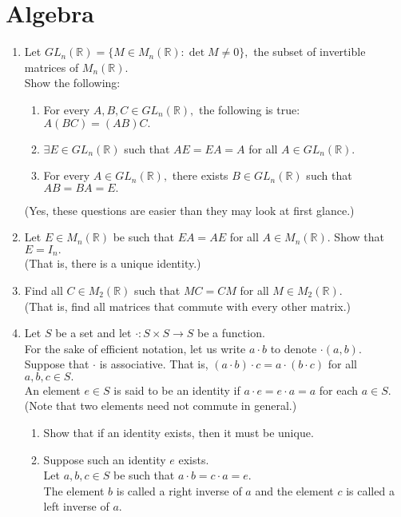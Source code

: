 \documentclass[12pt]{article}
\begin{document}
\section{Algebra}
\begin{enumerate} 
	\item Let $GL_n(\mathbb{R}) = \{M \in M_n(\mathbb{R}) : \det M \neq 0\},$ the subset of invertible matrices of $M_n(\mathbb{R}).$\\
	Show the following:
	\begin{enumerate}[nosep] 
		\item For every $A, B, C \in GL_n(\mathbb{R}),$ the following is true: $A(BC) = (AB)C.$ 
		\item $\exists E \in GL_n(\mathbb{R})$ such that $AE = EA = A$ for all $A \in GL_n(\mathbb{R}).$
		\item For every $A \in GL_n(\mathbb{R}),$ there exists $B \in GL_n(\mathbb{R})$ such that $AB = BA = E.$
	\end{enumerate}
	(Yes, these questions are easier than they may look at first glance.)
	\item Let $E \in M_n(\mathbb{R})$ be such that $EA = AE$ for all $A \in M_n(\mathbb{R}).$ Show that $E = I_n.$\\
	(That is, there is a unique identity.)
	\item Find all $C \in M_2(\mathbb{R})$ such that $MC = CM$ for all $M \in M_2(\mathbb{R}).$\\
	(That is, find all matrices that commute with every other matrix.)
	\item Let $S$ be a set and let $\cdot:S\times S\to S$ be a function.\\
	For the sake of efficient notation, let us write $a\cdot b$ to denote $\cdot(a, b).$\\
	Suppose that $\cdot$ is associative. That is, $(a\cdot b)\cdot c = a\cdot(b\cdot c)$ for all $a, b, c \in S.$\\
	An element $e \in S$ is said to be an identity if $a\cdot e = e \cdot a = a$ for each $a \in S.$ (Note that two elements need not commute in general.)
	\begin{enumerate}[nosep] 
		\item Show that if an identity exists, then it must be unique.
		\item Suppose such an identity $e$ exists.\\
		Let $a, b, c \in S$ be such that $a \cdot b = c \cdot a = e.$\\
		The element $b$ is called a right inverse of $a$ and the element $c$ is called a left inverse of $a.$

\end{enumerate}
\end{enumerate}
\end{document}
